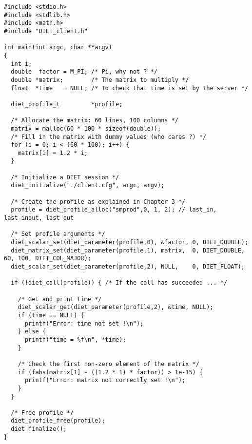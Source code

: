 {\footnotesize
\begin{verbatim}
#include <stdio.h>
#include <stdlib.h>
#include <math.h>
#include "DIET_client.h"

int main(int argc, char **argv)
{
  int i;
  double  factor = M_PI; /* Pi, why not ? */
  double *matrix;        /* The matrix to multiply */
  float  *time   = NULL; /* To check that time is set by the server */

  diet_profile_t         *profile;

  /* Allocate the matrix: 60 lines, 100 columns */
  matrix = malloc(60 * 100 * sizeof(double));
  /* Fill in the matrix with dummy values (who cares ?) */
  for (i = 0; i < (60 * 100); i++) {
    matrix[i] = 1.2 * i;
  }
  
  /* Initialize a DIET session */
  diet_initialize("./client.cfg", argc, argv);

  /* Create the profile as explained in Chapter 3 */
  profile = diet_profile_alloc("smprod",0, 1, 2); // last_in, last_inout, last_out
  
  /* Set profile arguments */
  diet_scalar_set(diet_parameter(profile,0), &factor, 0, DIET_DOUBLE);
  diet_matrix_set(diet_parameter(profile,1), matrix,  0, DIET_DOUBLE, 60, 100, DIET_COL_MAJOR);
  diet_scalar_set(diet_parameter(profile,2), NULL,    0, DIET_FLOAT);
  
  if (!diet_call(profile)) { /* If the call has succeeded ... */
     
    /* Get and print time */
    diet_scalar_get(diet_parameter(profile,2), &time, NULL);
    if (time == NULL) {
      printf("Error: time not set !\n");
    } else {
      printf("time = %f\n", *time);
    }

    /* Check the first non-zero element of the matrix */
    if (fabs(matrix[1] - ((1.2 * 1) * factor)) > 1e-15) {
      printf("Error: matrix not correctly set !\n");
    }
  }

  /* Free profile */
  diet_profile_free(profile);
  diet_finalize();
}
\end{verbatim}
}


